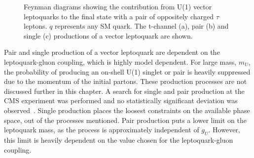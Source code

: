 \begin{figure}[t]
\begin{subfigure}[b]{0.3\textwidth}
\caption{}
\end{subfigure}
\hspace{2cm}
\begin{subfigure}[b]{0.3\textwidth}
\caption{}
\end{subfigure}
\vspace*{10mm}
\caption[Feynman diagrams for the production of a di-$\tau$ final state from vector leptoquarks.]{Feynman diagrams showing the contribution from U(1) vector leptoquarks to the final state with a pair of oppositely charged $\tau$ leptons. $q$ represents any SM quark. The t-channel (a), pair (b) and single (c) productions of a vector leptoquark are shown.}
\label{fig:leptoquark_feynman}
\end{figure}

Pair and single production of a vector leptoquark are dependent on the leptoquark-gluon coupling, which is highly model dependent.
For large mass, $m_U$, the probability of producing an on-shell U(1) singlet or pair is heavily suppressed due to the momentum of the initial partons.
These production processes are not discussed further in this chapter.
A search for single and pair production at the \ac{CMS} experiment was performed and no statistically significant deviation was observed~\cite{CMS:2022zks}.
Single production places the loosest constraints on the available phase space, out of the processes mentioned.
Pair production puts a lower limit on the leptoquark mass, as the process is approximately independent of $g_U$. 
However, this limit is heavily dependent on the value chosen for the leptoquark-gluon coupling. \\

